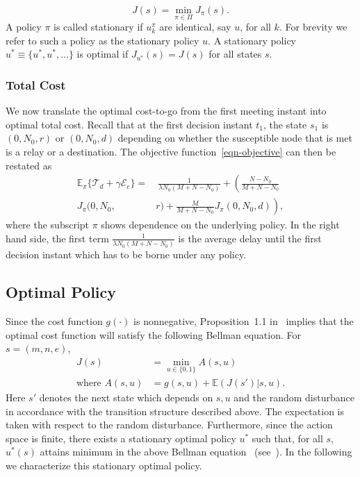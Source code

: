 \documentclass[10pt,journal,letterpaper]{IEEEtran}
\begin{document}
\begin{equation*}
J(s)  = \min_{\pi \in \Pi}J_{\pi}(s).
\end{equation*}
A policy $\pi$ is called stationary if $u^{\pi}_k$ are identical, say $u$, for all $k$.
For brevity we refer to such a policy as the stationary policy $u$.
A stationary policy $u^{\ast} \equiv \{u^{\ast},u^{\ast},\dots\}$ is optimal if $J_{u^{\ast}}(s) = J(s)$ for all states $s$.


\subsubsection{Total Cost}
We now translate the optimal cost-to-go from the first meeting instant into optimal total cost.
Recall that at the first decision instant $t_1$, the state
$s_1$ is $(0,N_0,r)$ or $(0,N_0,d)$ depending on whether the susceptible node that is met is a relay
or a destination.
The objective function~\eqref{eqn-objective} can then be restated as
\begin{align}
\mathbb{E}_{\pi}\{\mathcal{T}_d + \gamma\mathcal{E}_c\} =&~\frac{1}{\lambda N_0(M+N-N_0)} + \left(\frac{N-N_0}{M+N-N_0} \right. \nonumber\\
J_{\pi}(0,N_0,&r) + \left.\frac{M}{M+N-N_0}J_{\pi}(0,N_0,d)\right) \label{eqn:cost},
\end{align}
where the subscript $\pi$ shows dependence on the underlying policy. In the right hand side, the first term $\frac{1}{\lambda N_0(M+N-N_0)}$ is the average delay until the first decision instant which has to be borne under any policy.


\subsection{Optimal Policy}
\label{sec:opt-policy} Since the cost function $g(\cdot)$ is
nonnegative, Proposition~1.1 in~\cite[Chapter~3]{stochctrl.bertsekas07dpoc-vol2}
implies that the optimal cost function will satisfy the following
Bellman equation. For $s = (m,n,e)$,
\begin{align*}
J(s) &= \min_{u \in \{0,1\}} A(s,u) \\
\mbox{where } A(s,u) &= g(s,u) + \mathbb{E}\left(J(s')|s,u\right).
\end{align*}
Here $s'$ denotes the next state which depends on $s,u$ and the random disturbance
in accordance with the
transition structure described above. The expectation is taken with
respect to  the random disturbance. Furthermore, since the action
space is finite, there exists a stationary optimal policy $u^{\ast}$
such that, for all $s$, $u^{\ast}(s)$ attains minimum in the above
Bellman equation
~(see~\cite[Chapter~3]{stochctrl.bertsekas07dpoc-vol2}). In the
following we characterize this stationary optimal policy.
\end{document}
